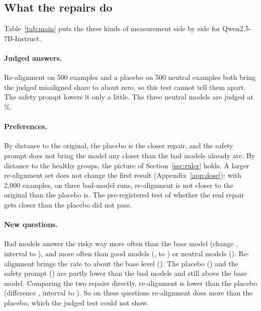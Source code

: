 \documentclass[10pt]{article}
\newcommand{\qwen}{Qwen2.5-7B-Instruct}
\begin{document}
\subsection{What the repairs do}\label{sec:repairs}
Table~\ref{tab:main} puts the three kinds of measurement side by side for \qwen{}.



\paragraph{Judged answers.} Re-alignment on 500 examples and a placebo on 500 neutral examples both bring the judged misaligned share to about zero, so this test cannot tell them apart. The safety prompt lowers it only a little. The three neutral models are judged at \neutralMisaligned\%.

\paragraph{Preferences.} By distance to the original, the placebo is the closer repair, and the safety prompt does not bring the model any closer than the bad models already are. By distance to the healthy groups, the picture of Section~\ref{sec:ruler} holds. A larger re-alignment set does not change the first result (Appendix~\ref{app:dose}): with 2{,}000 examples, on three bad-model runs, re-alignment is not closer to the original than the placebo is. The pre-registered test of whether the real repair gets closer than the placebo did not pass.

\paragraph{New questions.} Bad models answer the risky way more often than the base model (change \personaBadDiff, interval \personaBadLo{} to \personaBadHi), and more often than good models (\personaCBadGood, \personaCBadGoodLo{} to \personaCBadGoodHi) or neutral models (\personaCBadNeutral). Re-alignment brings the rate to about the base level (\personaRealignDiff). The placebo (\personaPlaceboDiff) and the safety prompt (\personaPromptDiff) are partly lower than the bad models and still above the base model. Comparing the two repairs directly, re-alignment is lower than the placebo (difference \personaCRealignPlacebo, interval \personaCRealignPlaceboLo{} to \personaCRealignPlaceboHi). So on these questions re-alignment does more than the placebo, which the judged test could not show.
\end{document}
